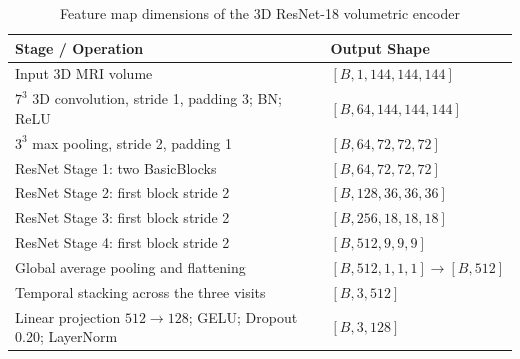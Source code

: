 \begin{table}[H]
\centering
\small
\caption{Feature map dimensions of the 3D ResNet-18 volumetric encoder}
\label{tab:mri-encoder-shapes}
\begin{tabularx}{\textwidth}{@{}Y l@{}}
\toprule
\textbf{Stage / Operation} & \textbf{Output Shape} \\
\midrule
Input 3D MRI volume & $[B,1,144,144,144]$ \\
$7^3$ 3D convolution, stride 1, padding 3; BN; ReLU & $[B,64,144,144,144]$ \\
$3^3$ max pooling, stride 2, padding 1 & $[B,64,72,72,72]$ \\
ResNet Stage 1: two BasicBlocks & $[B,64,72,72,72]$ \\
ResNet Stage 2: first block stride 2 & $[B,128,36,36,36]$ \\
ResNet Stage 3: first block stride 2 & $[B,256,18,18,18]$ \\
ResNet Stage 4: first block stride 2 & $[B,512,9,9,9]$ \\
Global average pooling and flattening & $[B,512,1,1,1]\to[B,512]$ \\
Temporal stacking across the three visits & $[B,3,512]$ \\
Linear projection $512\to128$; GELU; Dropout 0.20; LayerNorm & $[B,3,128]$ \\
\bottomrule
\end{tabularx}
\end{table}

\endgroup
